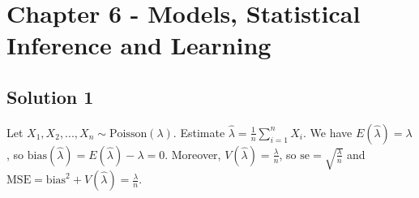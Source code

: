 \section*{Chapter 6 - Models, Statistical Inference and Learning}

\subsection*{Solution 1}

Let $X_1, X_2, ..., X_n \sim \mathrm{Poisson}(\lambda)$.
Estimate $\hat{\lambda} = \frac{1}{n} \sum_{i = 1}^n X_i$.
We have $E(\hat{\lambda}) = \lambda$, so $\mathrm{bias}(\hat{\lambda}) = E(\hat{\lambda}) - \lambda = 0$.
Moreover, $V(\hat{\lambda}) = \frac{\lambda}{n}$, so $\mathrm{se} = \sqrt{\frac{\lambda}{n}}$ and $\mathrm{MSE} = \mathrm{bias}^2 + V(\hat{\lambda}) = \frac{\lambda}{n}$.
